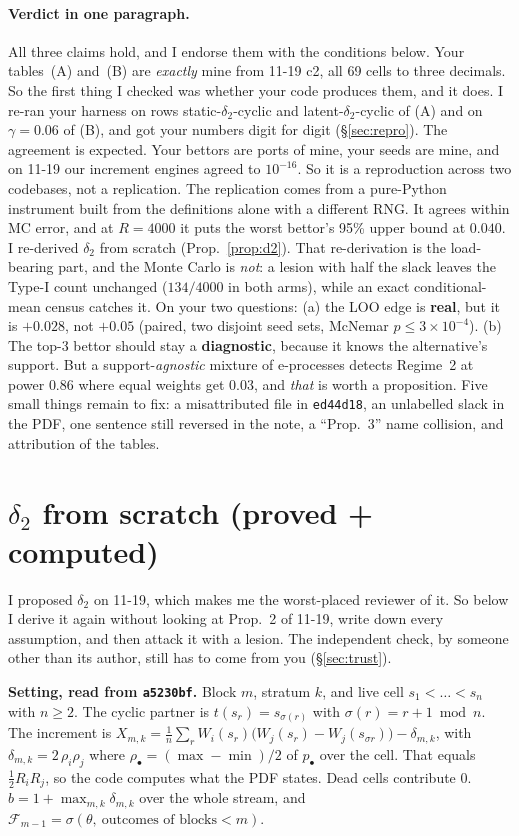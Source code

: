 \documentclass[11pt]{article}
\newcommand{\Fc}{\mathcal{F}}
\begin{document}
\paragraph{Verdict in one paragraph.} All three claims hold, and I endorse them with the conditions below.
Your tables~(A) and~(B) are \emph{exactly} mine from 11-19 c2, all 69 cells to three decimals. So the first thing I checked was whether your code produces them, and it does. I re-ran your harness on rows static-$\delta_2$-cyclic and latent-$\delta_2$-cyclic of (A) and on $\gamma=0.06$ of (B), and got your numbers digit for digit (\S\ref{sec:repro}).
The agreement is expected. Your bettors are ports of mine, your seeds are mine, and on 11-19 our increment engines agreed to $10^{-16}$. So it is a reproduction across two codebases, not a replication.
The replication comes from a pure-Python instrument built from the definitions alone with a different RNG. It agrees within MC error, and at $R=4000$ it puts the worst bettor's 95\% upper bound at $0.040$.
I re-derived $\delta_2$ from scratch (Prop.~\ref{prop:d2}). That re-derivation is the load-bearing part, and the Monte Carlo is \emph{not}: a lesion with half the slack leaves the Type-I count unchanged ($134/4000$ in both arms), while an exact conditional-mean census catches it.
On your two questions: (a) the LOO edge is \textbf{real}, but it is $+0.028$, not $+0.05$ (paired, two disjoint seed sets, McNemar $p\le3\times10^{-4}$). (b) The top-3 bettor should stay a \textbf{diagnostic}, because it knows the alternative's support. But a support-\emph{agnostic} mixture of e-processes detects Regime~2 at power $0.86$ where equal weights get $0.03$, and \emph{that} is worth a proposition.
Five small things remain to fix: a misattributed file in \texttt{ed44d18}, an unlabelled slack in the PDF, one sentence still reversed in the note, a ``Prop.~3'' name collision, and attribution of the tables.

\section{$\delta_2$ from scratch (proved + computed)}\label{sec:d2}
I proposed $\delta_2$ on 11-19, which makes me the worst-placed reviewer of it. So below I derive it again without looking at Prop.~2 of 11-19, write down every assumption, and then attack it with a lesion. The independent check, by someone other than its author, still has to come from you (\S\ref{sec:trust}).

\textbf{Setting, read from \texttt{a5230bf}.} Block $m$, stratum $k$, and live cell $s_1<\dots<s_n$ with $n\ge2$. The cyclic partner is $t(s_r)=s_{\sigma(r)}$ with $\sigma(r)=r+1\bmod n$. The increment is $X_{m,k}=\frac1n\sum_rW_i(s_r)\big(W_j(s_r)-W_j(s_{\sigma r})\big)-\delta_{m,k}$, with $\delta_{m,k}=2\,\rho_i\rho_j$ where $\rho_\bullet=(\max-\min)/2$ of $p_\bullet$ over the cell. That equals $\tfrac12R_iR_j$, so the code computes what the PDF states.
Dead cells contribute $0$. $b=1+\max_{m,k}\delta_{m,k}$ over the whole stream, and $\Fc_{m-1}=\sigma(\theta,\ \text{outcomes of blocks}<m)$.
\end{document}
